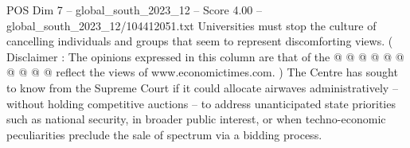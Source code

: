 \begin{textsample}{POS Dim 7 – global\_south\_2023\_12 – Score 4.00 – global\_south\_2023\_12/104412051.txt}
Universities must stop the culture of cancelling individuals and groups that seem to represent discomforting views. ( Disclaimer : The opinions expressed in this column are that of the @ @ @ @ @ @ @ @ @ @ reflect the views of www.economictimes.com. ) The Centre has sought to know from the Supreme Court if it could allocate airwaves administratively -- without holding competitive auctions -- to address unanticipated state priorities such as national security, in broader public interest, or when techno-economic peculiarities preclude the sale of spectrum via a bidding process.

\end{textsample}
